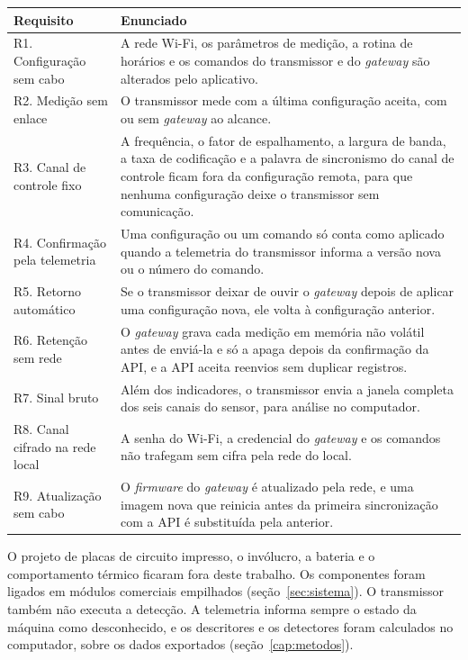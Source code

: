 \begin{quadro}[!htb]
\centering\small
\caption{Requisitos do sistema}\label{quadro:sis-requisitos}
\begin{tabular}{@{}>{\raggedright\arraybackslash}p{36mm}>{\raggedright\arraybackslash}p{118mm}@{}}
\toprule
Requisito & Enunciado \\
\midrule
R1. Configuração sem cabo & A rede Wi-Fi, os parâmetros de medição, a rotina de horários e os comandos do transmissor e do \textit{gateway} são alterados pelo aplicativo. \\
\addlinespace
R2. Medição sem enlace & O transmissor mede com a última configuração aceita, com ou sem \textit{gateway} ao alcance. \\
\addlinespace
R3. Canal de controle fixo & A frequência, o fator de espalhamento, a largura de banda, a taxa de codificação e a palavra de sincronismo do canal de controle ficam fora da configuração remota, para que nenhuma configuração deixe o transmissor sem comunicação. \\
\addlinespace
R4. Confirmação pela telemetria & Uma configuração ou um comando só conta como aplicado quando a telemetria do transmissor informa a versão nova ou o número do comando. \\
\addlinespace
R5. Retorno automático & Se o transmissor deixar de ouvir o \textit{gateway} depois de aplicar uma configuração nova, ele volta à configuração anterior. \\
\addlinespace
R6. Retenção sem rede & O \textit{gateway} grava cada medição em memória não volátil antes de enviá-la e só a apaga depois da confirmação da API, e a API aceita reenvios sem duplicar registros. \\
\addlinespace
R7. Sinal bruto & Além dos indicadores, o transmissor envia a janela completa dos seis canais do sensor, para análise no computador. \\
\addlinespace
R8. Canal cifrado na rede local & A senha do Wi-Fi, a credencial do \textit{gateway} e os comandos não trafegam sem cifra pela rede do local. \\
\addlinespace
R9. Atualização sem cabo & O \textit{firmware} do \textit{gateway} é atualizado pela rede, e uma imagem nova que reinicia antes da primeira sincronização com a API é substituída pela anterior. \\
\bottomrule
\end{tabular}
\end{quadro}

O projeto de placas de circuito impresso, o invólucro, a bateria e o comportamento térmico ficaram fora deste trabalho. Os componentes foram ligados em módulos comerciais empilhados (seção~\ref{sec:sistema}). O transmissor também não executa a detecção. A telemetria informa sempre o estado da máquina como desconhecido, e os descritores e os detectores foram calculados no computador, sobre os dados exportados (seção~\ref{cap:metodos}).

